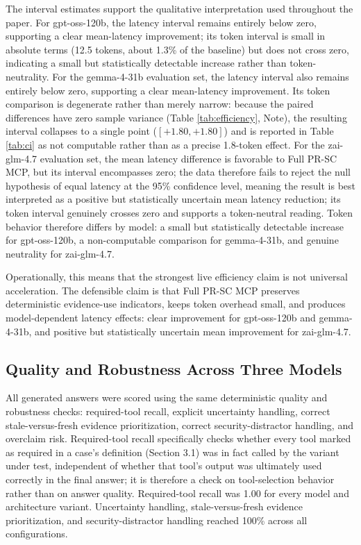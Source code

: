 The interval estimates support the qualitative interpretation used throughout the paper. For gpt-oss-120b, the latency interval remains entirely below zero, supporting a clear mean-latency improvement; its token interval is small in absolute terms (12.5 tokens, about 1.3\% of the baseline) but does not cross zero, indicating a small but statistically detectable increase rather than token-neutrality. For the gemma-4-31b evaluation set, the latency interval also remains entirely below zero, supporting a clear mean-latency improvement. Its token comparison is degenerate rather than merely narrow: because the paired differences have zero sample variance (Table \ref{tab:efficiency}, Note), the resulting interval collapses to a single point ($[+1.80, +1.80]$) and is reported in Table \ref{tab:ci} as not computable rather than as a precise 1.8-token effect. For the zai-glm-4.7 evaluation set, the mean latency difference is favorable to Full PR-SC MCP, but its interval encompasses zero; the data therefore fails to reject the null hypothesis of equal latency at the 95\% confidence level, meaning the result is best interpreted as a positive but statistically uncertain mean latency reduction; its token interval genuinely crosses zero and supports a token-neutral reading. Token behavior therefore differs by model: a small but statistically detectable increase for gpt-oss-120b, a non-computable comparison for gemma-4-31b, and genuine neutrality for zai-glm-4.7.

Operationally, this means that the strongest live efficiency claim is not universal acceleration. The defensible claim is that Full PR-SC MCP preserves deterministic evidence-use indicators, keeps token overhead small, and produces model-dependent latency effects: clear improvement for gpt-oss-120b and gemma-4-31b, and positive but statistically uncertain mean improvement for zai-glm-4.7.

\subsection{Quality and Robustness Across Three Models}

All generated answers were scored using the same deterministic quality and robustness checks: required-tool recall, explicit uncertainty handling, correct stale-versus-fresh evidence prioritization, correct security-distractor handling, and overclaim risk. Required-tool recall specifically checks whether every tool marked as required in a case's definition (Section 3.1) was in fact called by the variant under test, independent of whether that tool's output was ultimately used correctly in the final answer; it is therefore a check on tool-selection behavior rather than on answer quality. Required-tool recall was 1.00 for every model and architecture variant. Uncertainty handling, stale-versus-fresh evidence prioritization, and security-distractor handling reached 100\% across all configurations.

